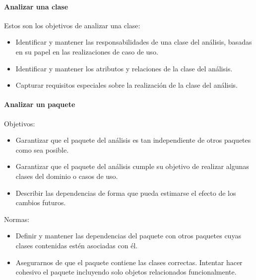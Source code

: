 \paragraph{Analizar una clase}
Estos son los objetivos de analizar una clase:
\begin{itemize}
\item Identificar y mantener las responsabilidades de una clase del análisis, basadas en su papel en las realizaciones de caso de uso.
\item Identificar y mantener los atributos y relaciones de la clase del análisis.
\item Capturar requisitos especiales sobre la realización de la clase del análisis.
\end{itemize}
\paragraph{Analizar un paquete}
Objetivos:
\begin{itemize}
\item Garantizar que el paquete del análisis es tan independiente de otros paquetes como sea posible.
\item Garantizar que el paquete del análisis cumple su objetivo de realizar algunas clases del dominio o casos de uso.
\item Describir las dependencias de forma que pueda estimarse el efecto de los cambios futuros.
\end{itemize}
Normas:
\begin{itemize}
\item Definir y mantener las dependencias del paquete con otros paquetes cuyas clases contenidas estén asociadas con él.
\item Asegurarnos de que el paquete contiene las clases correctas. Intentar hacer cohesivo el paquete incluyendo solo objetos relacionados funcionalmente.
\end{itemize}
